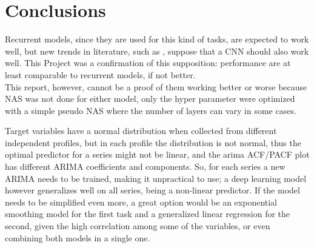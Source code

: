 \section{Conclusions}
Recurrent models, since they are used for this kind of tasks, are expected to work well, but new trends in literature, such as \cite{cnn_time}\cite{cnn_time_2}, suppose that a CNN should also work well. This Project was a confirmation of this supposition: performance are at least comparable to recurrent models, if not better. \\
This report, however, cannot be a proof of them working better or worse because NAS was not done for either model, only the hyper parameter were optimized with a simple pseudo NAS where the number of layers can vary in some cases.

Target variables have a normal distribution when collected from different independent profiles, but in each profile the distribution is not normal, thus the optimal predictor for a series might not be linear, and the arima ACF/PACF plot has different ARIMA coefficients and components.
So, for each series a new ARIMA needs to be trained, making it unpractical to use; a deep learning model however generalizes well on all series, being a non-linear predictor.
If the model needs to be simplified even more, a great option would be an exponential smoothing model for the first task and a generalized linear regression for the second, given the high correlation among some of the variables, or even combining both models in a single one.

